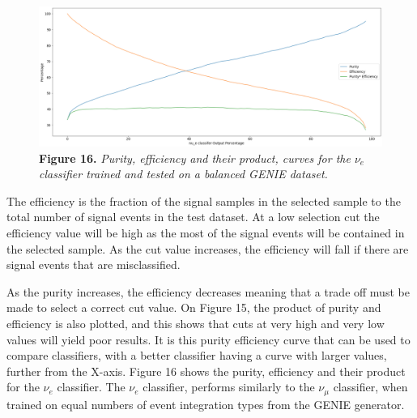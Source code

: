 \begin{figure}[t!]
 \centering
 \includegraphics[width=160mm]{genie/bal_genie/bal_genie_e_pe.png}
 \textbf{Figure 16.} \textit{Purity, efficiency and their product, curves for the $\nu_e$ classifier trained and tested on a balanced GENIE dataset.}
\end{figure}

\noindent The efficiency is the fraction of the signal samples in the selected sample to the total number of signal events in the test dataset. At a low selection cut the efficiency value will be high as the most of the signal events will be contained in the selected sample. As the cut value increases, the efficiency will fall if there are signal events that are misclassified. \medskip

\noindent As the purity increases, the efficiency decreases meaning that a trade off must be made to select a correct cut value. On Figure 15, the product of purity and efficiency is also plotted, and this shows that cuts at very high and very low values will yield poor results. It is this purity efficiency curve that can be used to compare classifiers, with a better classifier having a curve with larger values, further from the X-axis.  Figure 16 shows the purity, efficiency and their product for the $\nu_e$ classifier. The $\nu_e$ classifier, performs similarly to the $\nu_\mu$ classifier, when trained on equal numbers of event integration types from the GENIE generator. 

